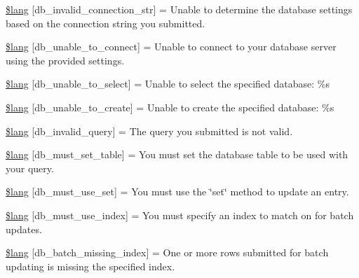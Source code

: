 \begin{DoxyCompactItemize}
\item 
\mbox{\hyperlink{db__lang_8php_a76d5998046a2a744fb884f1639d93b79}{\$lang}} \mbox{[}\textquotesingle{}db\+\_\+invalid\+\_\+connection\+\_\+str\textquotesingle{}\mbox{]} = \textquotesingle{}Unable to determine the database settings based on the connection string you submitted.\textquotesingle{}
\item 
\mbox{\hyperlink{db__lang_8php_ac10d44746d16ba23ecc0cd039b445952}{\$lang}} \mbox{[}\textquotesingle{}db\+\_\+unable\+\_\+to\+\_\+connect\textquotesingle{}\mbox{]} = \textquotesingle{}Unable to connect to your database server using the provided settings.\textquotesingle{}
\item 
\mbox{\hyperlink{db__lang_8php_a17fcd377fc12d3e77485014ed048e6ad}{\$lang}} \mbox{[}\textquotesingle{}db\+\_\+unable\+\_\+to\+\_\+select\textquotesingle{}\mbox{]} = \textquotesingle{}Unable to select the specified database\+: \%s\textquotesingle{}
\item 
\mbox{\hyperlink{db__lang_8php_ac18fdbc5da2d0428ec36f8b46789e542}{\$lang}} \mbox{[}\textquotesingle{}db\+\_\+unable\+\_\+to\+\_\+create\textquotesingle{}\mbox{]} = \textquotesingle{}Unable to create the specified database\+: \%s\textquotesingle{}
\item 
\mbox{\hyperlink{db__lang_8php_a08032c0aec25a34f912d6cc70f8fd99e}{\$lang}} \mbox{[}\textquotesingle{}db\+\_\+invalid\+\_\+query\textquotesingle{}\mbox{]} = \textquotesingle{}The query you submitted is not valid.\textquotesingle{}
\item 
\mbox{\hyperlink{db__lang_8php_a17d476a693b28e6705cd91e5e2d7a201}{\$lang}} \mbox{[}\textquotesingle{}db\+\_\+must\+\_\+set\+\_\+table\textquotesingle{}\mbox{]} = \textquotesingle{}You must set the database table to be used with your query.\textquotesingle{}
\item 
\mbox{\hyperlink{db__lang_8php_a10d5fbc7d872a2c1f28bd931f35c02af}{\$lang}} \mbox{[}\textquotesingle{}db\+\_\+must\+\_\+use\+\_\+set\textquotesingle{}\mbox{]} = \textquotesingle{}You must use the \char`\"{}set\char`\"{} method to update an entry.\textquotesingle{}
\item 
\mbox{\hyperlink{db__lang_8php_a65cbeda9bba673d61682c6974f27ac2a}{\$lang}} \mbox{[}\textquotesingle{}db\+\_\+must\+\_\+use\+\_\+index\textquotesingle{}\mbox{]} = \textquotesingle{}You must specify an index to match on for batch updates.\textquotesingle{}
\item 
\mbox{\hyperlink{db__lang_8php_acacf1b64d64a429a217318dc759be621}{\$lang}} \mbox{[}\textquotesingle{}db\+\_\+batch\+\_\+missing\+\_\+index\textquotesingle{}\mbox{]} = \textquotesingle{}One or more rows submitted for batch updating is missing the specified index.\textquotesingle{}

\end{DoxyCompactItemize}
